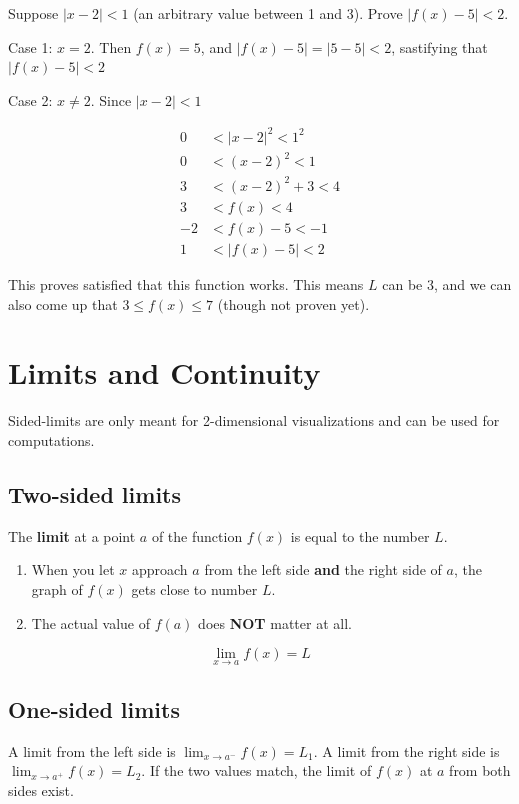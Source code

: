 \documentclass[
]{article}
\begin{document}
Suppose $|x - 2| < 1$ (an arbitrary value between 1 and 3). Prove
$\left| f(x) - 5 \right| < 2$.

Case 1: $x = 2$. Then $f(x) = 5$, and
$\left| f(x) - 5 \right| = |5 - 5| < 2$, sastifying that
$\left| f(x) - 5 \right| < 2$

Case 2: $x \neq 2$. Since $|x - 2| < 1$

\begin{align*}
0 &< |x - 2|^{2} < 1^{2}
 \\
0 &< (x - 2)^{2} < 1
 \\
3 &< (x - 2)^{2} + 3 < 4
 \\
3 &< f(x) < 4
 \\
- 2 &< f(x) - 5 < - 1
 \\
1 &< \left| f(x) - 5 \right| < 2
\end{align*}


This proves satisfied that this function works. This means $L$ can be
3, and we can also come up that $3 \leq f(x) \leq 7$ (though not
proven yet).


\section{Limits and Continuity}

Sided-limits are only meant for 2-dimensional visualizations and can be
used for computations.


\subsection{Two-sided limits}

The \textbf{limit} at a point $a$ of the function $f(x)$ is equal to
the number $L$.

\begin{enumerate}
\def\labelenumi{\arabic{enumi}.}
\item
  When you let $x$ approach $a$ from the left side \textbf{and} the
  right side of $a$, the graph of $f(x)$ gets close to number $L$.
\item
  The actual value of $f(a)$ does \textbf{NOT} matter at all.
\end{enumerate}

$$\lim_{x \rightarrow a}{f(x) = L}$$


\subsection{One-sided limits}

A limit from the left side is
$\lim_{x \rightarrow a^{-}}{f(x) = L_{1}}$. A limit from the right
side is $\lim_{x \rightarrow a^{+}}{f(x) = L_{2}}$. If the two values
match, the limit of $f(x)$ at $a$ from both sides exist.
\end{document}
